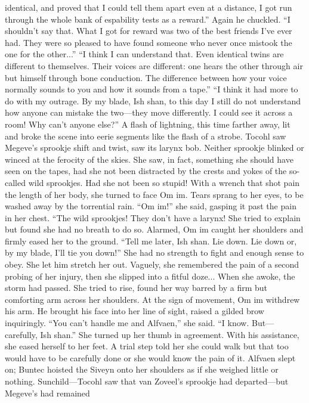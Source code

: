 \documentclass[9pt]{article}
\begin{document}
identical, and proved that I could tell them apart even at a distance, I got run through the whole bank of
espability tests as a reward.”
Again he chuckled. “I shouldn’t say that. What I got for reward was two of the best friends I’ve ever
had. They were so pleased to have found someone who never once mistook the one for the other...”
“I think I can understand that. Even identical twins are different to themselves. Their voices are
different: one hears the other through air but himself through bone conduction. The difference between
how your voice normally sounds to you and how it sounds from a tape.”
“I think it had more to do with my outrage. By my blade, Ish shan, to this day I still do not
understand how anyone can mistake the two—they move differently. I could see it across a room! Why
can’t anyone else?”
A flash of lightning, this time farther away, lit and broke the scene into eerie segments like the flash of
a strobe. Tocohl saw Megeve’s sprookje shift and twist, saw its larynx bob. Neither sprookje blinked or
winced at the ferocity of the skies.
She saw, in fact, something she should have seen on the tapes, had she not been distracted by the
crests and yokes of the so-called wild sprookjes. Had she not been so stupid!
With a wrench that shot pain the length of her body, she turned to face Om im. Tears sprang to her
eyes, to be washed away by the torrential rain. “Om im!” she said, gasping it past the pain in her chest.
“The wild sprookjes! They don’t have a larynx! She tried to explain but found she had no breath to do
so.
Alarmed, Om im caught her shoulders and firmly eased her to the ground. “Tell me later, Ish shan.
Lie down. Lie down or, by my blade, I’ll tie you down!”
She had no strength to fight and enough sense to obey. She let him stretch her out. Vaguely, she
remembered the pain of a second probing of her injury, then she slipped into a fitful doze...
When she awoke, the storm had passed. She tried to rise, found her way barred by a firm but
comforting arm across her shoulders.
At the sign of movement, Om im withdrew his arm. He brought his face into her line of sight, raised a
gilded brow inquiringly.
“You can’t handle me and Alfvaen,” she said.
“I know. But—carefully, Ish shan.”
She turned up her thumb in agreement. With his assistance, she eased herself to her feet. A trial step
told her she could walk but that too would have to be carefully done or she would know the pain of it.
Alfvaen slept on; Buntec hoisted the Siveyn onto her shoulders as if she weighed little or nothing.
Sunchild—Tocohl saw that van Zoveel’s sprookje had departed—but Megeve’s had remained
\end{document}
